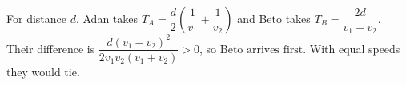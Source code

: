 For distance $d$, Adan takes $T_A=\dfrac{d}{2}(\dfrac{1}{v_1}+\dfrac{1}{v_2})$ and Beto takes $T_B=\dfrac{2d}{v_1+v_2}$. Their difference is $\dfrac{d(v_1-v_2)^2}{2v_1v_2(v_1+v_2)}>0$, so $\boxed{\text{Beto arrives first}}$. With equal speeds they would tie.
